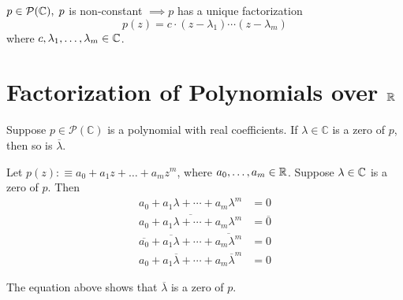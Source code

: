 \begin{thm} 
  \label{fundamental-theorem-of-algebra-second-version}
  $p \in \mathcal{P}(\mathbb{C}), \; p$ is non-constant $\implies p$ has a unique factorization
  \begin{equation}
  	p(z)=c \cdot (z-\lambda_1) \cdots (z-\lambda_m) 
  \end{equation}
  where $c, \lambda_1, \dots, \lambda_m \in \mathbb{C}$.
\end{thm}

\section{Factorization of Polynomials over $\mathbb{R}$}

\begin{thm}
  \label{thm: polynomials with real coefficients have nonreal zeros in pairs}
  Suppose $p\in \mathcal{P} (\mathbb{C})$ is a polynomial with real coefficients. If $\lambda \in \mathbb{C}$ is a zero of $p$, then so is $\overline{\lambda}$.
\end{thm}
\begin{prf}
  Let $p(z) :\equiv a_0 + a_1 z + \ldots + a_m z^m$, where $a_0, \ldots, a_m \in \mathbb{R}$. Suppose $\lambda \in \mathbb{C}$ is a zero of $p$. Then 
  \begin{equation}
    \begin{aligned}
      a_0+a_1\lambda+\cdots+a_m\lambda^m&=0\\
      \overline{a_0+a_1\lambda+\cdots+a_m\lambda^m}&=\overline{0}\\
      \overline{a_0}+\overline{a_1\lambda}+\cdots+\overline{a_m\lambda^m}&=0\\
      a_0+a_1\overline{\lambda}+\cdots+a_m\overline{\lambda}^m&=0
    \end{aligned}
  \end{equation}
  
  The equation above shows that $\overline{\lambda}$ is a zero of $p$.
\end{prf}

